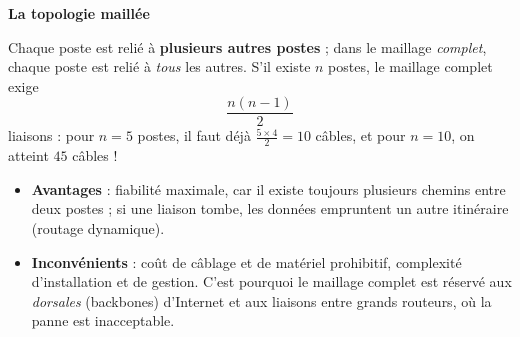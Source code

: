 \documentclass[11pt]{article}
\begin{document}
\textbf{La topologie maillée}\par
Chaque poste est relié à \textbf{plusieurs autres postes} ; dans le maillage \emph{complet}, chaque poste est relié à \emph{tous} les autres. S'il existe $n$ postes, le maillage complet exige
\[ \frac{n(n-1)}{2} \]
liaisons : pour $n = 5$ postes, il faut déjà $\frac{5 \times 4}{2} = 10$ câbles, et pour $n = 10$, on atteint $45$ câbles !

\begin{itemize}
\item \textbf{Avantages} : fiabilité maximale, car il existe toujours plusieurs chemins entre deux postes ; si une liaison tombe, les données empruntent un autre itinéraire (routage dynamique).
\item \textbf{Inconvénients} : coût de câblage et de matériel prohibitif, complexité d'installation et de gestion. C'est pourquoi le maillage complet est réservé aux \emph{dorsales} (backbones) d'Internet et aux liaisons entre grands routeurs, où la panne est inacceptable.
\end{itemize}
\end{document}
